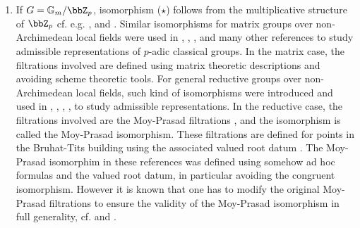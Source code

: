 \documentclass[10pt]{alggeom}
\theoremstyle{definition}
\numberwithin{equation}{section}
\begin{document}
\begin{enumerate}
\item  
 If $G=\mathbb G_m/\bbZ_p$,  isomorphism ($\star$) follows from the multiplicative structure of $\bbZ _p $ cf. e.g. \cite{He1913}, \cite{Ha50} and \cite[Chap. 15]{Ha80}. Similar isomorphisms for matrix groups over non-Archimedean local fields were used in \cite[p.~442 line 1]{Ho77}, \cite[2.13]{Mo91}, \cite[p.~22]{BK93}, \cite[p.~337]{Sec04} and many other references to study admissible representations of $p$-adic classical groups. In the matrix case, the filtrations involved are defined using matrix theoretic descriptions and avoiding scheme theoretic tools. For general reductive groups over non-Archimedean local fields, such kind of isomorphisms were introduced and used in  \cite[\S2]{PR84}, \cite[\S2]{MP94}, \cite{MP96},
\cite[\S1]{Ad98}, \cite[\S1]{Yu01} to study admissible representations. In the reductive case, the filtrations involved are the Moy-Prasad filtrations  \cite{MP94}, \cite{MP96} and the isomorphism is called the Moy-Prasad isomorphism. These filtrations are defined for points in the Bruhat-Tits building using the associated valued root datum \cite{BT72} \cite{BT84}. The Moy-Prasad isomorphim in these references was defined using somehow ad hoc formulas and the valued root datum, in particular avoiding the congruent isomorphism. However it is known that one has to modify the original Moy-Prasad filtrations to ensure the validity of the Moy-Prasad isomorphism in full generality, cf. \cite[§0.3]{Yu15} and \cite[§13]{KP22}.

 \end{enumerate}
\xrema 
\end{document}
